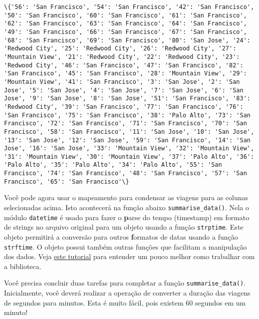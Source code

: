 \documentclass[11pt]{article}
\begin{document}
    \begin{Verbatim}[commandchars=\\\{\}]
\{'56': 'San Francisco', '54': 'San Francisco', '42': 'San Francisco', '50': 'San Francisco', '60': 'San Francisco', '61': 'San Francisco', '62': 'San Francisco', '63': 'San Francisco', '64': 'San Francisco', '49': 'San Francisco', '66': 'San Francisco', '67': 'San Francisco', '68': 'San Francisco', '69': 'San Francisco', '80': 'San Jose', '24': 'Redwood City', '25': 'Redwood City', '26': 'Redwood City', '27': 'Mountain View', '21': 'Redwood City', '22': 'Redwood City', '23': 'Redwood City', '46': 'San Francisco', '47': 'San Francisco', '82': 'San Francisco', '45': 'San Francisco', '28': 'Mountain View', '29': 'Mountain View', '41': 'San Francisco', '3': 'San Jose', '2': 'San Jose', '5': 'San Jose', '4': 'San Jose', '7': 'San Jose', '6': 'San Jose', '9': 'San Jose', '8': 'San Jose', '51': 'San Francisco', '83': 'Redwood City', '39': 'San Francisco', '77': 'San Francisco', '76': 'San Francisco', '75': 'San Francisco', '38': 'Palo Alto', '73': 'San Francisco', '72': 'San Francisco', '71': 'San Francisco', '70': 'San Francisco', '58': 'San Francisco', '11': 'San Jose', '10': 'San Jose', '13': 'San Jose', '12': 'San Jose', '59': 'San Francisco', '14': 'San Jose', '16': 'San Jose', '33': 'Mountain View', '32': 'Mountain View', '31': 'Mountain View', '30': 'Mountain View', '37': 'Palo Alto', '36': 'Palo Alto', '35': 'Palo Alto', '34': 'Palo Alto', '55': 'San Francisco', '74': 'San Francisco', '48': 'San Francisco', '57': 'San Francisco', '65': 'San Francisco'\}

    \end{Verbatim}

    Você pode agora usar o mapeamento para condensar as viagens para as
colunas selecionadas acima. Isto acontecerá na função abaixo
\texttt{summarise\_data()}. Nela o módulo \texttt{datetime} é usado para
fazer o \textbf{p}arse do tempo (timestamp) em formato de strings no
arquivo original para um objeto usando a função \texttt{strptime}. Este
objeto permitirá a conversão para outros \textbf{f}ormatos de datas
usando a função \texttt{strftime}. O objeto possui também outras funções
que facilitam a manipulação dos dados. Veja
\href{http://usandopython.com.br/manipulando-data-hora-python-datetime/}{este
tutorial} para entender um pouco melhor como trabalhar com a biblioteca.

Você precisa concluir duas tarefas para completar a função
\texttt{summarise\_data()}. Inicialmente, você deverá realizar a
operação de converter a duração das viagens de segundos para minutos.
Esta é muito fácil, pois existem 60 segundos em um minuto!
\end{document}

